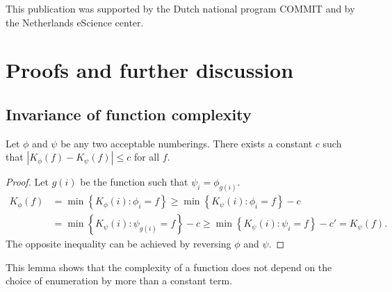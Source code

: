 \documentclass{style/llncs}
\begin{document}
\subsubsection*{\ackname}

This publication was supported by the Dutch national program COMMIT and by  the Netherlands eScience center.




\appendix

\section{Proofs and further discussion}

\subsection{Invariance of function complexity}

\begin{lemma}
Let $\phi$ and $\psi$ be any two acceptable numberings. There exists a constant $c$ such that $\left| K_\phi(f) - K_\psi(f)\right | \leq c$ for all $f$. \label{lemma:invariance}
\end{lemma}
\begin{proof}
Let $g(i)$ be the function such that $\psi_i=\phi_{g(i)}$.
\begin{align*}
K_\phi(f) &= \min\left\{ K_\phi(i) : \phi_i= f\right\} 
\geq \min\left\{ K_\psi(i) : \phi_i= f\right\} - c\\
&= \min\left\{ K_\psi(i) : \psi_{g(i)}= f\right\} - c
\geq \min\left\{ K_\psi(i) : \psi_i= f\right\} - c' = K_\psi(f).
\end{align*}
The opposite inequality can be achieved by reversing $\phi$ and $\psi$. 
\end{proof}
This lemma shows that the complexity of a function does not depend on the choice of
enumeration by more than a constant term.
\end{document}
